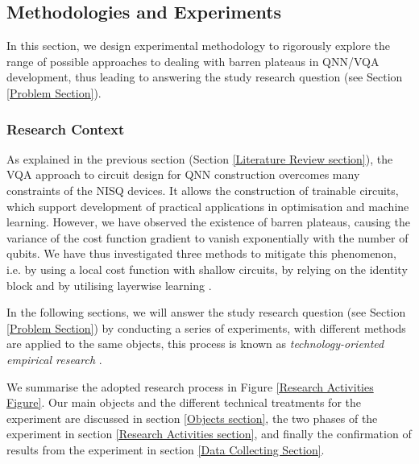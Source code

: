 \subsection{Methodologies and Experiments}
In this section, we design experimental methodology to rigorously explore the range of possible approaches to dealing with barren plateaus in QNN/VQA development, thus leading to answering the study research question (see Section \ref{Problem Section}).

\subsubsection{Research Context}

As explained in the previous section (Section \ref{Literature Review section}), the VQA approach to circuit design for QNN construction overcomes many constraints of the NISQ devices. It allows the construction of trainable circuits, which support development of practical applications in optimisation and machine learning.
However, we have observed the existence of barren plateaus, causing the variance of the cost function gradient to vanish exponentially with the number of qubits.
We have thus investigated three methods to mitigate this phenomenon, i.e. by using a local cost function with shallow circuits, by relying on the identity block and by utilising layerwise learning \cite{cerezoCostFunctionDependent2021, liuParameterInitializationMethod2021, skolikLayerwiseLearningQuantum2021}.

In the following sections, we will answer the study research question (see Section \ref{Problem Section}) by conducting a series of experiments, with different methods are applied to the same objects, this process is known as \emph{technology-oriented empirical research} \cite{wohlinExperimentationSoftwareEngineering2012}.

We summarise the adopted research process in Figure \ref{Research Activities Figure}.
Our main objects and the different technical treatments for the experiment are discussed in section \ref{Objects section}, the two phases of the experiment in section \ref{Research Activities section}, and finally the confirmation of results from the experiment in section \ref{Data Collecting Section}.

